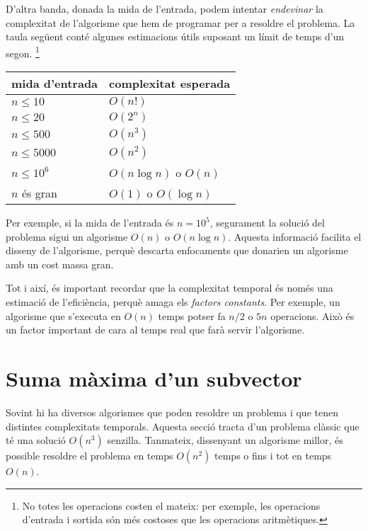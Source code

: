 D'altra banda, donada la mida de l'entrada,
podem intentar \emph{endevinar}
la complexitat de l'algorisme que hem de programar
per a resoldre el problema.
La taula següent conté algunes estimacions útils
suposant un límit de temps d'un segon. \footnote{No totes les operacions
costen el mateix: per exemple, les operacions d'entrada i sortida
són més costoses que les operacions aritmètiques.}

\begin{center}
\begin{tabular}{ll}
mida d'entrada & complexitat esperada \\
\hline
$n \le 10$ & $O(n!)$ \\
$n \le 20$ & $O(2^n)$ \\
$n \le 500$ & $O(n^3)$ \\
$n \le 5000$ & $O(n^2)$ \\
$n \le 10^6$ & $O(n \log n)$ o $O(n)$ \\
$n$ és gran & $O(1)$ o $O(\log n)$ \\
\end{tabular}
\end{center}

Per exemple, si la mida de l'entrada és $n=10^5$,
segurament la solució del problema sigui un
algorisme $O(n)$ o $O(n \log n)$.
Aquesta informació facilita el disseny de l'algorisme,
perquè descarta enfocaments que donarien
un algorisme amb un cost massa gran.


Tot i així, és important recordar que
la complexitat temporal és només una estimació de l'eficiència,
perquè amaga els \emph{factors constants}.
Per exemple, un algorisme que s'executa en $O(n)$ temps
potser fa $n/2$ o $5n$ operacions.
Això és un factor important de cara al temps
real que farà servir l'algorisme.

\section{Suma màxima d'un subvector}


Sovint hi ha diversos algorismes
que poden resoldre un problema i que tenen distintes
complexitats temporals.
Aquesta secció tracta d'un problema clàssic que
té una solució $O(n^3)$ senzilla.
Tanmateix, dissenyant un algorisme millor, 
és possible resoldre el problema en temps $O(n^2)$
temps o fins i tot en temps $O(n)$.

